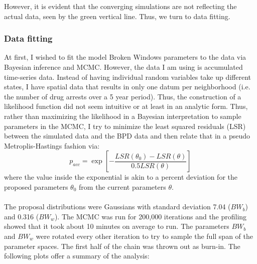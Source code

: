 \documentclass[10pt]{article}
\begin{document}
 However, it is evident that the converging simulations are not reflecting the actual data, seen by the green vertical line. Thus, we turn to data fitting.
 
\subsubsection{Data fitting}
  At first, I wished to fit the model Broken Windows parameters to the data via Bayesian inference and MCMC. However, the data I am using is accumulated time-series data. Instead of having individual random variables take up different states, I have spatial data that results in only one datum per neighborhood (i.e. the number of drug arrests over a 5 year period). Thus, the construction of a likelihood function did not seem intuitive or at least in an analytic form. Thus, rather than maximizing the likelihood in a Bayesian interpretation to sample parameters in the MCMC, I try to minimize the least squared residuals (LSR) between the simulated data and the BPD data and then relate that in a pseudo Metroplis-Hastings fashion via:
  \begin{equation}
  p_{acc} = \exp{[-\frac{LSR(\theta_0) - LSR(\theta)}{0.5LSR(\theta)}]}
  \end{equation}
  where the value inside the exponential is akin to a percent deviation for the proposed parameters $\theta_0$ from the current parameters $\theta$. \\
  \\
  The proposal distributions were Gaussians with standard deviation 7.04 ($BW_b$) and 0.316 ($BW_w$). The MCMC was run for 200,000 iterations and the profiling showed that it took about 10 minutes on average to run. The parameters $BW_b$ and $BW_w$ were rotated every other iteration to try to sample the full span of the parameter spaces. The first half of the chain was thrown out as burn-in. The following plots offer a summary of the analysis:
\end{document}
